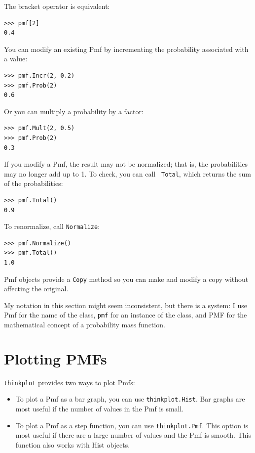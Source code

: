 \documentclass[12pt]{book}
\theoremstyle{exercise}
\begin{document}
The bracket operator is equivalent:%

\begin{verbatim}
>>> pmf[2]
0.4
\end{verbatim}

You can modify an existing Pmf by incrementing the probability
associated with a value:
%
\begin{verbatim}
>>> pmf.Incr(2, 0.2)
>>> pmf.Prob(2)
0.6
\end{verbatim}

Or you can multiply a probability by a factor:
%
\begin{verbatim}
>>> pmf.Mult(2, 0.5)
>>> pmf.Prob(2)
0.3
\end{verbatim}

If you modify a Pmf, the result may not be normalized; that is, the
probabilities may no longer add up to 1.  To check, you can call {\tt
  Total}, which returns the sum of the probabilities:
%
\begin{verbatim}
>>> pmf.Total()
0.9
\end{verbatim}

To renormalize, call {\tt Normalize}:
%
\begin{verbatim}
>>> pmf.Normalize()
>>> pmf.Total()
1.0
\end{verbatim}

Pmf objects provide a {\tt Copy} method so you can make
and modify a copy without affecting the original.%

My notation in this section might seem inconsistent, but there is a
system: I use Pmf for the name of the class, {\tt pmf} for an instance
of the class, and PMF for the mathematical concept of a
probability mass function.


\section{Plotting PMFs}%

{\tt thinkplot} provides two ways to plot Pmfs:%

\begin{itemize}

\item To plot a Pmf as a bar graph, you can use 
{\tt thinkplot.Hist}.  Bar graphs are most useful if the number
of values in the Pmf is small.%
%

\item To plot a Pmf as a step function, you can use
{\tt thinkplot.Pmf}.  This option is most useful if there are
a large number of values and the Pmf is smooth.  This function
also works with Hist objects.%
%
%
%

\end{itemize}
\end{document}
